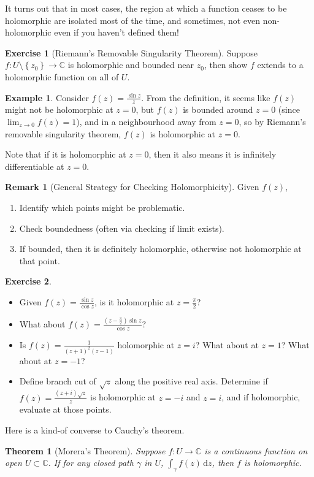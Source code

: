 \documentclass[a4paper, 12pt]{article}
\newtheorem{theorem}{Theorem}
\theoremstyle{definition}
\newtheorem{exercise}{Exercise}
\newtheorem{example}{Example}
\newtheorem{remark}{Remark}
\numberwithin{theorem}{section}
\numberwithin{definition}{section}
\numberwithin{exercise}{section}
\numberwithin{remark}{section}
\numberwithin{figure}{section}
\numberwithin{example}{section}
\newcommand{\C}{\mathbb{C}}
\newcommand{\intd}{\,\text{d}}
\begin{document}
It turns out that in most cases, the region at which a function ceases to be holomorphic
are isolated most of the time, and sometimes, not even non-holomorphic even if you haven't defined them!
\begin{exercise}[Riemann's Removable Singularity Theorem]
    Suppose $f:U \setminus \left\{ z_0 \right\} \rightarrow \C$ is holomorphic and bounded near $z_0$,
    then show $f$ extends to a holomorphic function on all of $U$.
\end{exercise}
\begin{example}
    Consider $f(z) = \frac{\sin{z}}{z}$.
    From the definition, it seems like $f(z)$ might not be holomorphic at $z=0$,
    but $f(z)$ is bounded around $z=0$ (since $\lim_{z\rightarrow 0} f(z) = 1$),
    and in a neighbourhood away from $z=0$,
    so by Riemann's removable singularity theorem,
    $f(z)$ is holomorphic at $z=0$.

    Note that if it is holomorphic at $z=0$, then it also means it is infinitely differentiable at $z=0$.
\end{example}
\begin{remark}[General Strategy for Checking Holomorphicity]
    Given $f(z)$,
    \begin{enumerate}
        \item Identify which points might be problematic.
        \item Check boundedness (often via checking if limit exists).
        \item If bounded, then it is definitely holomorphic, otherwise not holomorphic at that point.
    \end{enumerate}
\end{remark}
\begin{exercise}
    \begin{itemize}
        \item Given $f(z) = \frac{\sin{z}}{\cos{z}}$, is it holomorphic at $z=\frac{\pi}{2}$?
        \item What about $f(z) = \frac{\left( z-\frac{\pi}{2} \right)\sin{z}}{\cos{z}}$?
        \item Is $f(z) = \frac{1}{(z+1)^2 (z-1)}$ holomorphic at $z=i$? What about at $z=1$? What about at $z=-1$?
        \item Define branch cut of $\sqrt{z}$ along the positive real axis.
            Determine if $f(z) = \frac{\left( z+i \right) \sqrt{z}}{z}$ is holomorphic at $z=-i$ and $z=i$, and if holomorphic, evaluate at those points.
    \end{itemize}
\end{exercise}

Here is a kind-of converse to Cauchy's theorem.
\begin{theorem}[Morera's Theorem]
    Suppose $f:U \rightarrow \C$ is a continuous function on open $U \subset \C$.
    If for any closed path $\gamma$ in $U$, $\int_{\gamma} f(z) \intd z$,
    then $f$ is holomorphic.
\end{theorem}
\end{document}
